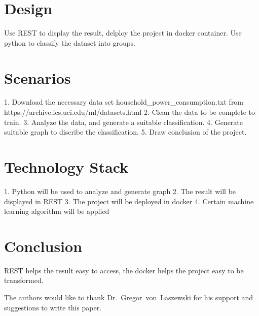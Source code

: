 \section{Design}

Use REST to display the result, delploy the project in docker container.
Use python to classify the dataset into groups.

\section{Scenarios}

1. Download the necessary data set household_power_consumption.txt from https://archive.ics.uci.edu/ml/datasets.html
2. Clean the data to be complete to train.
3. Analyze the data, and generate a suitable classification.
4. Generate suitable graph to discribe the classification.
5. Draw conclusion of the project.

\section{Technology Stack}

1. Python will be used to analyze and generate graph
2. The result will be displayed in REST
3. The project will be deployed in docker
4. Certain machine learning algorithm will be applied

\section{Conclusion}

REST helps the result easy to access, the docker helps the project easy to be transformed.


\begin{acks}

  The authors would like to thank Dr.~Gregor~von~Laszewski for his
  support and suggestions to write this paper.

\end{acks}


 

